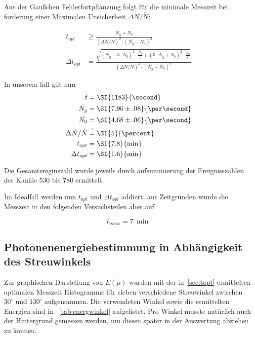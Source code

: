 \documentclass[draft, slug=CS, room=Andreas-Schubert-Bau\,\ Labor\ 406,
supervisor=Juliane\ Volkmer, coursedate=29.\ 11.\ 2019]{../../Lab_Report_LaTeX/lab_report}
\begin{document}
Aus der Gau\ss{}chen Fehlerfortpflanzung folgt f\"ur die minimale
Messzeit bei forderung einer Maximalen Unsicherheit
\(\Delta\dot{N}/\dot{N}\):

\begin{align}
  \label{eq:mtime}
  t_{opt} & \geq\frac{\dot{N_g} +
            \dot{N_0}}{(\Delta\dot{N}/\dot{N})^2\cdot (\dot{N_g} -
            \dot{N_0})^2} \\
  \Delta t_{opt} &=\frac{\sqrt{(\dot{N_g} +
                   3\cdot\dot{N_0})^2\cdot\frac{\dot{N_g}}{t}
                   + (3\cdot\dot{N_g} + \dot{N_0})^2\cdot\frac{\dot{N_0}}{t}}}{(\Delta\dot{N}/\dot{N})^2\cdot (\dot{N_g} -
            \dot{N_0})^3}
\end{align}

In unserem fall gilt nun
\begin{align}
  t &=\SI{1183}{\second} \\
  \dot{N_g} &=\SI{7.96\pm.08}{\per\second} \\
  \dot{N_0} &=\SI{4.68\pm.06}{\per\second} \\
  \Delta\dot{N}/\dot{N} &\overset{!}{=}\SI{5}{\percent} \\
  t_{opt} &=\SI{7.8}{\min} \\
  \Delta t_{opt} &=\SI{1.6}{\min}
\end{align}

Die Gesamtereginszahl wurde jeweils durch aufsummierung der
Ereignisszahlen der Kan\"ale \(530\) bis \(780\) ermittelt.

Im Idealfall werden nun \(t_{opt}\) und \(\Delta t_{opt}\) addiert,
aus Zeitgr\"unden wurde die Messzeit in den folgenden Versuchsteilen
aber auf

\begin{equation}
  \label{eq:fmtime}
  t_{mess} = \SI{7}{\min}
\end{equation}

\subsection{Photonenenergiebestimmung in Abhängigkeit des Streuwinkels}
\label{sec:energwinkel}

Zur graphischen Darstellung von \(E(\mu)\) wurden mit der in~\ref{sec:topt} ermittelten
optimalen Messzeit Histogramme für sieben verschiedene Streuwinkel zwischen \(30^\circ\) und
\(130^\circ\) aufgenommen. Die verwendeten Winkel sowie die ermittelten Energien sind in
~\ref{tab:energwinkel} aufgelistet. Pro Winkel musste natürlich auch der Hintergrund gemessen
werden, um diesen später in der Auswertung abziehen zu können.
\end{document}
